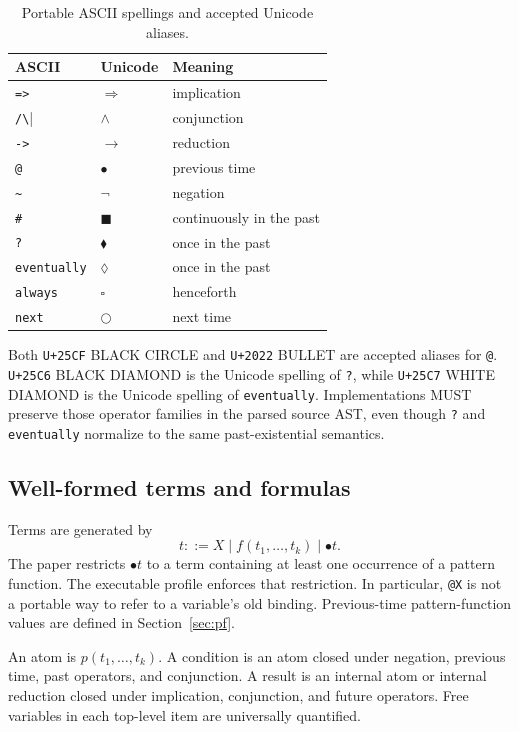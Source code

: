 \documentclass[11pt]{article}
\newcommand{\prev}{\mathbin{\bullet}}
\newcommand{\alwayspast}{\mathbin{\blacksquare}}
\newcommand{\once}{\mathbin{\blacklozenge}}
\newcommand{\eventuallypast}{\mathbin{\lozenge}}
\newcommand{\alwaysfuture}{\mathbin{\square}}
\begin{document}
\begin{table}[ht]
\centering
\begin{tabular}{lll}
\toprule
ASCII & Unicode & Meaning \\
\midrule
\verb|=>| & $\Rightarrow$ & implication \\
\verb|/\| & $\wedge$ & conjunction \\
\verb|->| & $\to$ & reduction \\
\verb|@| & $\prev$ & previous time \\
\verb|~| & $\neg$ & negation \\
\verb|#| & $\alwayspast$ & continuously in the past \\
\verb|?| & $\once$ & once in the past \\
\verb|eventually| & $\eventuallypast$ & once in the past \\
\verb|always| & $\alwaysfuture$ & henceforth \\
\verb|next| & $\bigcirc$ & next time \\
\bottomrule
\end{tabular}
\caption{Portable ASCII spellings and accepted Unicode aliases.}
\label{tab:aliases}
\end{table}

Both \texttt{U+25CF} BLACK CIRCLE and \texttt{U+2022} BULLET are accepted
aliases for \verb|@|.  \texttt{U+25C6} BLACK DIAMOND is the Unicode spelling of
\verb|?|, while \texttt{U+25C7} WHITE DIAMOND is the Unicode spelling of
\verb|eventually|.  Implementations MUST preserve those operator families in
the parsed source AST, even though \verb|?| and \verb|eventually| normalize to
the same past-existential semantics.

\subsection{Well-formed terms and formulas}

Terms are generated by
\[
t ::= X \mid f(t_1,\ldots,t_k) \mid \prev t.
\]
The paper restricts $\prev t$ to a term containing at least one occurrence of
a pattern function.  The executable profile enforces that restriction.  In
particular, \verb|@X| is not a portable way to refer to a variable's old
binding.  Previous-time pattern-function values are defined in
Section~\ref{sec:pf}.

An atom is $p(t_1,\ldots,t_k)$.  A condition is an atom closed under negation,
previous time, past operators, and conjunction.  A result is an internal atom
or internal reduction closed under implication, conjunction, and future
operators.  Free variables in each top-level item are universally quantified.
\end{document}
